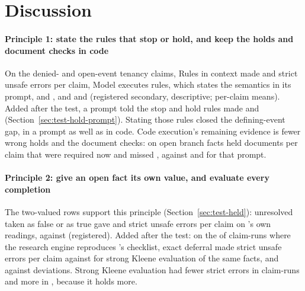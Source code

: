 \section{Discussion}
\label{sec:discussion}

\paragraph{Principle 1: state the rules that stop or hold, and keep the holds and document checks in code}
On the denied- and open-event tenancy claims, Rules in context made \sthreeRicDeniedStrict{} and \sthreeRicOpenEventStrict{} strict unsafe errors per claim, Model executes rules, which states the semantics in its prompt, \sthreeMerDeniedStrict{} and \sthreeMerOpenEventStrict, and \casepath \sthreeCasePathDeniedStrict{} and \sthreeCasePathOpenEventStrict{} (registered secondary, descriptive; per-claim means). Added after the test, a prompt told the stop and hold rules made \sbcHoldPromptODeniedStrict{} and \sbcHoldPromptOOpenEventStrict{} (Section~\ref{sec:test-hold-prompt}). Stating those rules closed the defining-event gap, in a prompt as well as in code. Code execution's remaining evidence is fewer wrong holds and the document checks: on open branch facts \casepath held \sbcCasePathOpenBranchHeldReq{} documents per claim that were required now and missed \sbcCasePathOpenBranchMissed, against \sbcHoldPromptOpenBranchHeldReq{} and \sbcHoldPromptOpenBranchMissed{} for that prompt.

\paragraph{Principle 2: give an open fact its own value, and evaluate every completion}
The two-valued rows support this principle (Section~\ref{sec:test-held}): unresolved taken as false or as true gave \sthreeTwoValFalseTenStrict{} and \sthreeTwoValTrueTenStrict{} strict unsafe errors per claim on \casepath's own readings, against \sthreeCasePathTenStrict{} (registered). Added after the test: on the \sthreeRElevenBReproduced{} of \sthreeRElevenBEvaluated{} claim-runs where the research engine reproduces \casepath's checklist, exact deferral made \sthreeRElevenBExactStrict{} strict unsafe errors per claim against \sthreeRElevenBKleeneStrict{} for strong Kleene evaluation of the same facts, and \sthreeRElevenBExactAllDev{} against \sthreeRElevenBKleeneAllDev{} deviations. Strong Kleene evaluation had fewer strict errors in \sthreeRElevenBKleeneFewerStrict{} claim-runs and more in \sthreeRElevenBKleeneMoreStrict, because it holds more.

